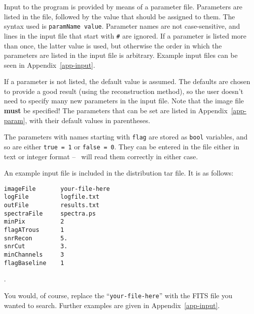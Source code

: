 \label{sec-param}

Input to the program is provided by means of a parameter
file. Parameters are listed in the file, followed by the value that
should be assigned to them. The syntax used is \texttt{paramName
value}. Parameter names are not case-sensitive, and lines in the input
file that start with \texttt{\#} are ignored. If a parameter is listed
more than once, the latter value is used, but otherwise the order in
which the parameters are listed in the input file is
arbitrary. Example input files can be seen in
Appendix~\ref{app-input}.

If a parameter is not listed, the default value is assumed. The
defaults are chosen to provide a good result (using the reconstruction
method), so the user doesn't need to specify many new parameters in
the input file. Note that the image file \textbf{must} be specified!
The parameters that can be set are listed in Appendix~\ref{app-param},
with their default values in parentheses.

The parameters with names starting with \texttt{flag} are stored as
\texttt{bool} variables, and so are either \texttt{true = 1} or
\texttt{false = 0}. They can be entered in the file either in text or
integer format -- \duchamp\ will read them correctly in either case.

An example input file is included in the distribution tar file. It is
as follows:

\begin{verbatim}
imageFile       your-file-here
logFile         logfile.txt
outFile         results.txt
spectraFile     spectra.ps
minPix          2
flagATrous      1
snrRecon        5.
snrCut          3.
minChannels     3
flagBaseline    1
\end{verbatim}.

You would, of course, replace the ``\texttt{your-file-here}'' with the
FITS file you wanted to search. Further examples are given in
Appendix~\ref{app-input}.
